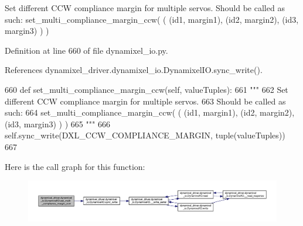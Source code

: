 \begin{DoxyVerb}Set different CCW compliance margin for multiple servos.
Should be called as such:
set_multi_compliance_margin_ccw( ( (id1, margin1), (id2, margin2), (id3, margin3) ) )
\end{DoxyVerb}
 

Definition at line 660 of file dynamixel\+\_\+io.\+py.



References dynamixel\+\_\+driver.\+dynamixel\+\_\+io.\+Dynamixel\+I\+O.\+sync\+\_\+write().


\begin{DoxyCode}
660     \textcolor{keyword}{def }set\_multi\_compliance\_margin\_ccw(self, valueTuples):
661         \textcolor{stringliteral}{"""}
662 \textcolor{stringliteral}{        Set different CCW compliance margin for multiple servos.}
663 \textcolor{stringliteral}{        Should be called as such:}
664 \textcolor{stringliteral}{        set\_multi\_compliance\_margin\_ccw( ( (id1, margin1), (id2, margin2), (id3, margin3) ) )}
665 \textcolor{stringliteral}{        """}
666         self.sync\_write(DXL\_CCW\_COMPLIANCE\_MARGIN, tuple(valueTuples))
667 
\end{DoxyCode}
Here is the call graph for this function\+:
\nopagebreak
\begin{figure}[H]
\begin{center}
\leavevmode
\includegraphics[width=350pt]{dd/d77/classdynamixel__driver_1_1dynamixel__io_1_1_dynamixel_i_o_a20243d60946e850c4bccf94edfa2504a_cgraph}
\end{center}
\end{figure}
\mbox{\label{classdynamixel__driver_1_1dynamixel__io_1_1_dynamixel_i_o_a57b4bb815b4946e8759c512c3a7aec90}} 
